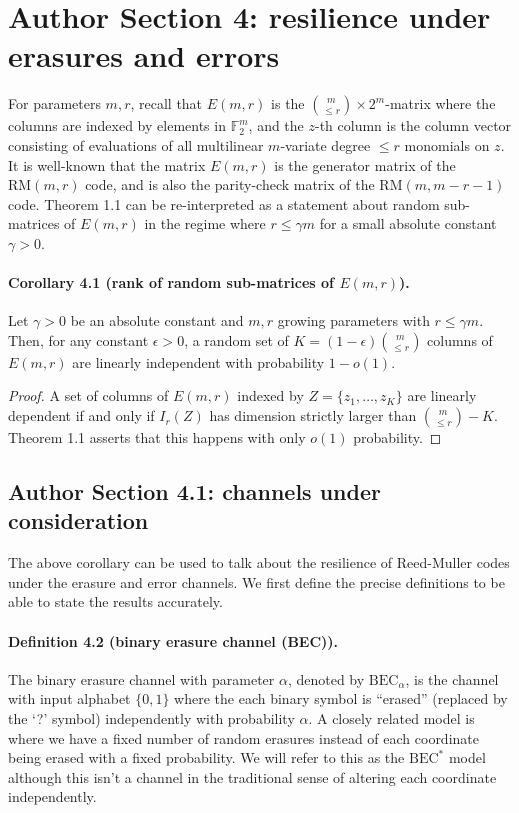 \section*{Author Section 4: resilience under erasures and errors}
For parameters $m,r$, recall that $E(m,r)$ is the $\binom m{\le r}\times2^m$-matrix where the columns are indexed by elements in $\mathbb F_2^m$, and the $z$-th column is the column vector consisting of evaluations of all multilinear $m$-variate degree $\le r$ monomials on $z$. It is well-known that the matrix $E(m,r)$ is the generator matrix of the $\mathrm{RM}(m,r)$ code, and is also the parity-check matrix of the $\mathrm{RM}(m,m-r-1)$ code. Theorem 1.1 can be re-interpreted as a statement about random sub-matrices of $E(m,r)$ in the regime where $r\le\gamma m$ for a small absolute constant $\gamma>0$.
\paragraph{Corollary 4.1 (rank of random sub-matrices of $E(m,r)$).} Let $\gamma>0$ be an absolute constant and $m,r$ growing parameters with $r\le\gamma m$. Then, for any constant $\epsilon>0$, a random set of $K=(1-\epsilon)\binom m{\le r}$ columns of $E(m,r)$ are linearly independent with probability $1-o(1)$.
\begin{proof}A set of columns of $E(m,r)$ indexed by $Z=\{z_1,\ldots,z_K\}$ are linearly dependent if and only if $I_r(Z)$ has dimension strictly larger than $\binom m{\le r}-K$. Theorem 1.1 asserts that this happens with only $o(1)$ probability.\end{proof}
\subsection*{Author Section 4.1: channels under consideration}
The above corollary can be used to talk about the resilience of Reed-Muller codes under the erasure and error channels. We first define the precise definitions to be able to state the results accurately.
\paragraph{Definition 4.2 (binary erasure channel (BEC)).} The binary erasure channel with parameter $\alpha$, denoted by $\mathrm{BEC}_\alpha$, is the channel with input alphabet $\{0,1\}$ where the each binary symbol is ``erased'' (replaced by the `?' symbol) independently with probability $\alpha$.
A closely related model is where we have a fixed number of random erasures instead of each coordinate being erased with a fixed probability. We will refer to this as the $\mathrm{BEC}^*$ model although this isn't a channel in the traditional sense of altering each coordinate independently.

